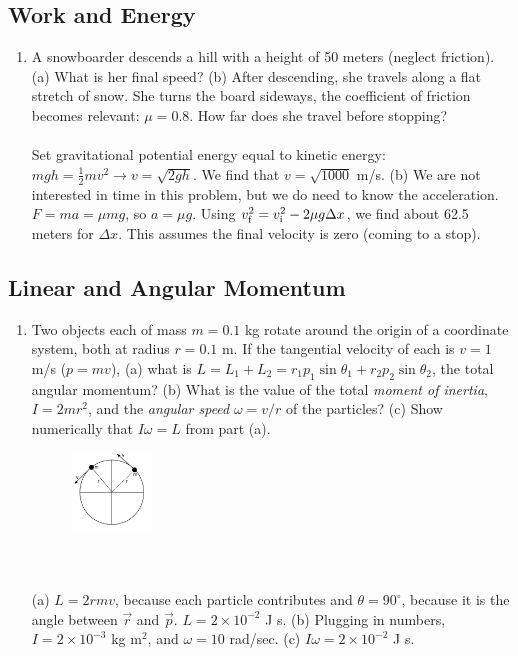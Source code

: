\documentclass[10pt]{article}
\begin{document}
\subsection{Work and Energy}
\begin{enumerate}
\item A snowboarder descends a hill with a height of 50 meters (neglect friction).  (a) What is her final speed?  (b) After descending, she travels along a flat stretch of snow.  She turns the board sideways, the coefficient of friction becomes relevant: $\mu = 0.8$.  How far does she travel before stopping? \\ \\
Set gravitational potential energy equal to kinetic energy: $mgh = \frac{1}{2}mv^2 \rightarrow v = \sqrt{2gh}$.  We find that $v = \sqrt{1000}$ m/s.  (b) We are not interested in time in this problem, but we do need to know the acceleration.  $F = ma = \mu m g$, so $a = \mu g$.  Using $v_{\rm f}^2 = v_{\rm i}^2 - 2 \mu g \Delta x$, we find about 62.5 meters for $\Delta x$.  This assumes the final velocity is zero (coming to a stop).
\end{enumerate}
\subsection{Linear and Angular Momentum}
\begin{enumerate}
\item Two objects each of mass $m = 0.1$ kg rotate around the origin of a coordinate system, both at radius $r = 0.1$ m.  If the tangential velocity of each is $v = 1$ m/s ($p = mv$), (a) what is $L = L_1 + L_2 = r_1 p_1\sin\theta_1+r_2 p_2\sin\theta_2$, the total angular momentum?  (b) What is the value of the total \textit{moment of inertia}, $I = 2mr^2$, and the \textit{angular speed} $\omega = v/r$ of the particles?  (c) Show numerically that $I\omega = L$ from part (a).
\begin{figure}[hb]
\centering
\includegraphics[width=0.2\textwidth]{rotate.pdf}
\end{figure}
\\ \\
(a) $L = 2 r m v$, because each particle contributes and $\theta = 90^{\circ}$, because it is the angle between $\vec{r}$ and $\vec{p}$.  $L = 2\times 10^{-2}$ J s.  (b) Plugging in numbers, $I = 2 \times 10^{-3}$ kg m$^2$, and $\omega = 10$ rad/sec.  (c) $I\omega = 2\times 10^{-2}$ J s.
\end{enumerate}
\end{document}
